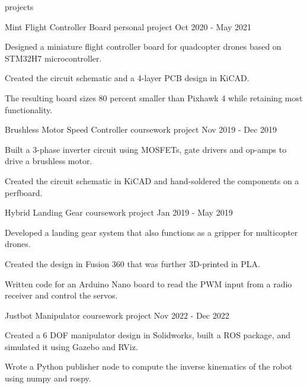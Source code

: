 \begin{section}{projects}
  
  \begin{project}
    {Mint Flight Controller Board}
    {personal project}
    {Oct 2020 - May 2021}

    \item Designed a miniature flight controller board for quadcopter drones based on STM32H7 microcontroller.
    \item Created the circuit schematic and a 4-layer PCB design in KiCAD.
    \item The resulting board sizes 80 percent smaller than Pixhawk 4 while retaining most functionality.
  
  \end{project}

  \begin{project}
    {Brushless Motor Speed Controller}
    {coursework project}
    {Nov 2019 - Dec 2019}

    \item Built a 3-phase inverter circuit using MOSFETs, gate drivers and op-amps to drive a brushless motor.
    \item Created the circuit schematic in KiCAD and hand-soldered the components on a perfboard.
  
  \end{project}

  \begin{project}
    {Hybrid Landing Gear}
    {coursework project}
    {Jan 2019 - May 2019}

    \item Developed a landing gear system that also functions as a gripper for multicopter drones.
    \item Created the design in Fusion 360 that was further 3D-printed in PLA.
    \item Written code for an Arduino Nano board to read the PWM input from a radio receiver and control the servos.
  
  \end{project}

  \begin{project}
    {Justbot Manipulator}
    {coursework project}
    {Nov 2022 - Dec 2022}

    \item Created a 6 DOF manipulator design in Solidworks, built a ROS package, and simulated it using Gazebo and RViz.
    \item Wrote a Python publisher node to compute the inverse kinematics of the robot using numpy and rospy.
  
  \end{project}

\end{section}